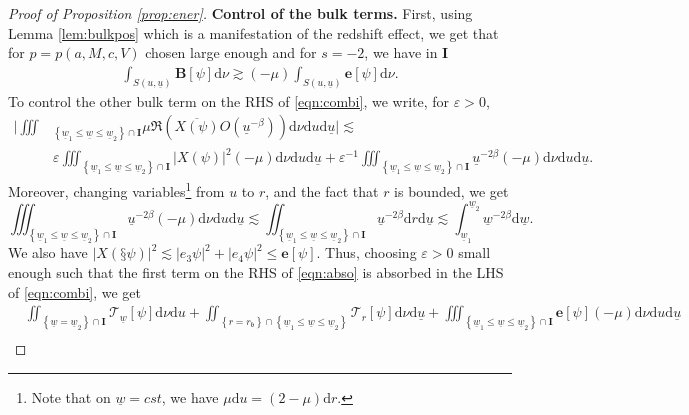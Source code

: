 \documentclass[reqno]{amsart}
\numberwithin{equation}{section}
\newcommand{\Real}{\mathfrak{R}}
\newcommand{\wbar}{\underline{w}}
\newcommand{\ubar}{{\underline{u}}}
\newcommand{\dee}{\mathrm{d}}
\newcommand{\ener}{\mathbf{e}}
\newcommand{\un}{\mathbf{I}}
\theoremstyle{plain}
\theoremstyle{definition}
\theoremstyle{remark}
\numberwithin{equation}{section}
\begin{document}
\begin{proof}[Proof of Proposition \ref{prop:ener}]
\noindent\textbf{Control of the bulk terms.}
First, using Lemma \ref{lem:bulkpos} which is a manifestation of the redshift effect, we get that for $p=p(a,M,c,V)$ chosen large enough and for $s=-2$, we have in $\un$
    \begin{align}\label{eq:bulkposI2}
    \int_{S(u,\ubar)}\mathbf{B}[\psi]\dee\nu\gtrsim (-\mu)\int_{S(u,\ubar)}\ener[\psi]\dee\nu.
\end{align}
To control the other bulk term on the RHS of \eqref{eqn:combi}, we write, for $\varepsilon>0$,
\begin{align}
    \Bigg|\iiint&_{\left\{\underline{w}_1 \leq \underline{w} \leq \underline{w}_2\right\} \cap \mathbf{I}} \mu\Real(\overline{X(\psi)}O(\ubar^{-\beta})) \dee\nu \mathrm{d} u \mathrm{d} \underline{u}\Bigg|\lesssim \nonumber\\
    &\varepsilon\iiint_{\left\{\underline{w}_1 \leq \underline{w} \leq \underline{w}_2\right\} \cap \mathbf{I}} |X(\psi)|^2(-\mu)\dee\nu \mathrm{d} u \mathrm{d} \underline{u}+\varepsilon^{-1}\iiint_{\left\{\underline{w}_1 \leq \underline{w} \leq \underline{w}_2\right\} \cap \mathbf{I}} \ubar^{-2\beta} (-\mu)\dee\nu \mathrm{d} u \mathrm{d} \underline{u}.\label{eqn:abso}
\end{align}
Moreover, changing variables\footnote{Note that on $\wbar=cst$, we have $\mu\dee u=(2-\mu)\dee r$.\label{footnote}} from $u$ to $r$, and the fact that $r$ is bounded, we get
$$\iiint_{\left\{\underline{w}_1 \leq \underline{w} \leq \underline{w}_2\right\} \cap \mathbf{I}} \ubar^{-2\beta} (-\mu)\dee\nu \mathrm{d} u \mathrm{d} \underline{u}\lesssim\iint_{\left\{\underline{w}_1 \leq \underline{w} \leq \underline{w}_2\right\} \cap \mathbf{I}} \ubar^{-2\beta} \mathrm{d} r \mathrm{d} \underline{u}\lesssim\int_{\wbar_1}^{\wbar_2}\wbar^{-2\beta}\dee\wbar.$$
We also have $|X(§\psi)|^2\lesssim |e_3\psi|^2+|e_4\psi|^2\leq\ener[\psi]$. Thus, choosing $\varepsilon>0$ small enough such that the first term on the RHS of \eqref{eqn:abso} is absorbed in the LHS of \eqref{eqn:combi}, we get 
\begin{align}\label{eqn:combi2}
& \iint_{\left\{\underline{w}=\underline{w}_2\right\} \cap \mathbf{I}} \mathcal{T}_{\underline{w}}[\psi] \dee\nu \mathrm{d} u+\iint_{\left\{r=r_{\mathfrak{b}}\right\} \cap\left\{\underline{w}_1 \leq \underline{w} \leq \underline{w}_2\right\}} \mathcal{T}_r[\psi] \dee\nu \mathrm{d} \underline{u}+\iiint_{\left\{\underline{w}_1 \leq \underline{w} \leq \underline{w}_2\right\} \cap \mathbf{I}} \mathbf{e}[\psi] (-\mu)\dee\nu \mathrm{d} u \mathrm{d} \underline{u} \nonumber\\

\end{align}
\end{proof}
\end{document}
